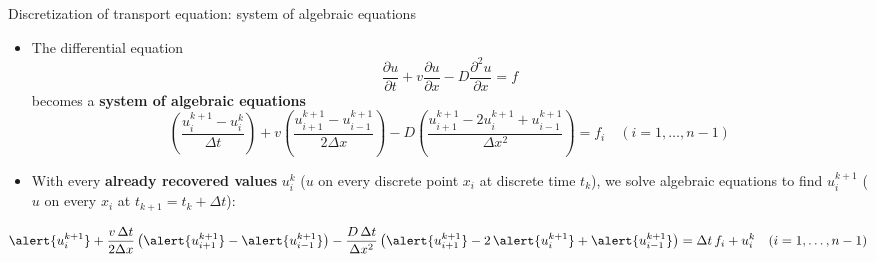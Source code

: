 %
%
\begin{frame}{Discretization of transport equation: system of algebraic equations}

\small
\begin{itemize}
\item The differential equation
\[
\frac{\partial u}{\partial t}+v\frac{\partial u}{\partial x}-D\frac{\partial^{2}u}{\partial x}=f
\]
becomes a \textbf{system of algebraic equations}
\[
\left(\frac{u_{i}^{k+1}-u_{i}^{k}}{\Delta t}\right)+v\left(\frac{u_{i+1}^{k+1}-u_{i-1}^{k+1}}{2\Delta x}\right)-D\left(\frac{u_{i+1}^{k+1}-2u^{k+1}_{i}+u_{i-1}^{k+1}}{\Delta x^{2}}\right)=f_{i}\quad(i=1,\ldots,n-1)
\]
\item With every {\bf already recovered values} $u^k_i$ ($u$ on every \alert{discrete point} $x_{i}$ at \alert{discrete time} $t_{k}$), we solve algebraic equations to find $u^{k+1}_i$ ($u$ on every $x_{i}$ at ${t_{k+1}=t_{k}+\Delta t}$):\\[10pt]
\end{itemize}
%
\[
\alert{u_{i}^{k+1}}
+ \frac{v \, \Delta t}{2\Delta x} \left(\alert{u_{i+1}^{k+1}}-\alert{u_{i-1}^{k+1}}\right)
- \frac{D \, \Delta t}{\Delta x^{2}} \left(\alert{u_{i+1}^{k+1}}-2\,\alert{u^{k+1}_{i}}+\alert{u_{i-1}^{k+1}}\right) 
= \Delta t \, f_{i} + u_{i}^{k} \quad(i=1,\ldots,n-1)
\]


\end{frame}
%
%
